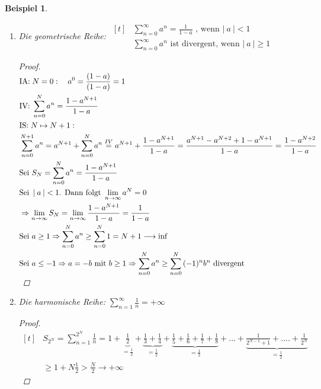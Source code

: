 \documentclass[a4paper,titlepage,oneside]{article}
\newcommand{\IA}[1][n=0]{\vspace{0.1pt}\ensuremath{\text{IA:}\sp#1:}}
\newcommand{\IV}{\vspace{0.1pt}\ensuremath{\text{IV:}\sp}}
\newcommand{\IS}[1][n \mapsto n+1]{\vspace{0.1pt}\ensuremath{\text{IS:}\sp#1:}}
\def\sp{\hspace{0,1cm}}
\newcommand{\suminf}[2][n]{\ensuremath{\sum_{#1= 0}^{\infty}{#2}}}
\renewcommand{\liminf}[2][n]{\ensuremath{\lim\limits_{#1 \rightarrow \infty}{#2}}}
\newcommand{\abs}[1]{\ensuremath{\left|\:#1\:\right|}}
\theoremstyle{thmstyle}
\newtheorem{bsp}[satz]{Beispiel}
\theoremstyle{subthmstyle}
\begin{document}
\begin{bsp}\
\begin{enumerate}
\item Die geometrische Reihe:
\begin{math}\displaystyle \begin{aligned}[t]
&\suminf{a^n} = \frac{1}{1-a} \text{ , wenn } \abs{a} < 1 \\
&\suminf{a^n} \text{ ist divergent, wenn } \abs{a} \ge 1
\end{aligned}\end{math} 

\begin{proof}
\begin{math}\displaystyle \begin{aligned}[t]
&\IA[N=0] \quad a^0 = \frac{(1-a)}{(1- a)} = 1 \\
&\IV \sum_{n = 0}^{N}{a^n} = \frac{1-a^{N+1}}{1-a} \\
&\IS[N \mapsto N+1] \\
&\sum_{n = 0}^{N+1}{a^n} = a^{N+1} + \sum_{n = 0}^{N}{a^n} \overset{IV}{=} a^{N+1} + \frac{1-a^{N+1}}{1-a} = \frac{a^{N+1} - a^{N+2} + 1 - a^{N+1}}{1-a} = \frac{1 - a^{N+2}}{1-a}\\
&\text{Sei }S_N = \sum_{n=0}^{N}{a^n} = \frac{1 - a^{N+1}}{1- a} \\
&\text{Sei }\abs{a} < 1\text{. Dann folgt }\liminf{a^N} = 0 \\
&\Rightarrow \liminf{S_N} = \liminf{\frac{1-a^{N+1}}{1-a}} = \frac{1}{1-a} \\
&\text{Sei }a \ge 1 \Rightarrow \sum_{n=0}^{N}{a^n} \ge \sum_{n=0}^{N}{1} = N+1 \longrightarrow \inf \\
&\text{Sei }a \le -1 \Rightarrow a = -b \text{ mit }b \ge 1 \Rightarrow \sum_{n=0}^{N}{a^n} \ge \sum_{n=0}^{N}{(-1)^nb^n} \text{ divergent}
\end{aligned}\end{math} 
\end{proof}

\item Die harmonische Reihe: $ \displaystyle \sum_{n=1}^{\infty}{\frac{1}{n}} = +\infty$

\begin{proof}
\begin{math}\displaystyle \begin{aligned}[t]
&S_{2^N} = \sum_{n = 1}^{2^N}{\frac{1}{n}} =
1 +\underbrace{\frac{1}{2}}_{=\frac{1}{2}} + \underbrace{\frac{1}{3} + \frac{1}{4}}_{=\frac{1}{2}} + \underbrace{\frac{1}{5} + \frac{1}{6} + \frac{1}{7} + \frac{1}{8}}_{=\frac{1}{2}} +  ... + \underbrace{\frac{1}{2^{N-1}+1}+ .... + \frac{1}{2^N}}_{=\frac{1}{2}} \\
&\ge 1 + N \frac{1}{2} > \frac{N}{2} \longrightarrow +\infty
\end{aligned}\end{math} 


\end{proof}
\end{enumerate}
\end{bsp}
\end{document}
